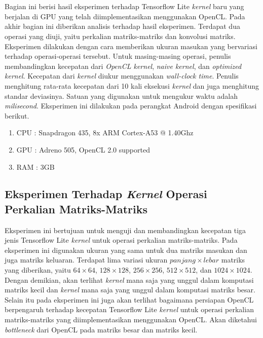 \chapter{\babLima}
Bagian ini berisi hasil eksperimen terhadap Tensorflow Lite \textit{kernel} baru yang berjalan di GPU yang telah diimplementasikan menggunakan OpenCL. Pada akhir bagian ini diberikan analisis terhadap hasil eksperimen. Terdapat dua operasi yang diuji, yaitu perkalian matriks-matriks dan konvolusi matriks. Eksperimen dilakukan dengan cara memberikan ukuran masukan yang bervariasi terhadap operasi-operasi tersebut. Untuk masing-masing operasi, penulis membandingkan kecepatan dari \textit{OpenCL kernel}, \textit{naive kernel}, dan \textit{optimized kernel}. Kecepatan dari \textit{kernel} diukur menggunakan \textit{wall-clock time}. Penulis menghitung rata-rata kecepatan dari 10 kali eksekusi \textit{kernel} dan juga menghitung standar deviasinya. Satuan yang digunakan untuk mengukur waktu adalah \textit{milisecond}. Eksperimen ini dilakukan pada perangkat Android dengan spesifikasi berikut.

\begin{enumerate}
	\item CPU : Snapdragon 435, 8x ARM Cortex-A53 @ 1.40Ghz
	\item GPU : Adreno 505, OpenCL 2.0 supported
	\item RAM : 3GB
\end{enumerate}

\section{Eksperimen Terhadap \textit{Kernel} Operasi Perkalian Matriks-Matriks }
Eksperimen ini bertujuan untuk menguji dan membandingkan kecepatan tiga jenis Tensorflow Lite \textit{kernel} untuk operasi perkalian matriks-matriks. Pada eksperimen ini digunakan ukuran yang sama untuk dua matriks masukan dan juga matriks keluaran. Terdapat lima variasi ukuran $panjang \times lebar$ matriks yang diberikan, yaitu $64 \times 64$, $128 \times 128$, $256 \times 256$, $512 \times 512$, dan $1024 \times 1024$. Dengan demikian, akan terlihat \textit{kernel} mana saja yang unggul dalam komputasi matriks kecil dan \textit{kernel} mana saja yang unggul dalam komputasi matriks besar. Selain itu pada eksperimen ini juga akan terlihat bagaimana persiapan OpenCL berpengaruh terhadap kecepatan Tensorflow Lite \textit{kernel} untuk operasi perkalian matriks-matriks yang diimplementasikan menggunakan OpenCL. Akan diketahui \textit{bottleneck} dari OpenCL pada matriks besar dan matriks kecil. 

